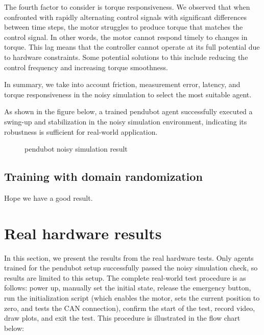 The fourth factor to consider is torque responsiveness. We observed that when confronted with rapidly alternating control signals with significant differences between time steps, the motor struggles to produce torque that matches the control signal. In other words, the motor cannot respond timely to changes in torque. This lag means that the controller cannot operate at its full potential due to hardware constraints. Some potential solutions to this include reducing the control frequency and increasing torque smoothness.

In summary, we take into account friction, measurement error, latency, and torque responsiveness in the noisy simulation to select the most suitable agent.

As shown in the figure below, a trained pendubot agent successfully executed a swing-up and stabilization in the noisy simulation environment, indicating its robustness is sufficient for real-world application.

\begin{figure}[htbp]
    \centering
    \caption{pendubot noisy simulation result}
    \label{fig:image_b}
\end{figure}

\subsection{Training with domain randomization}
Hope we have a good result.


\section{Real hardware results}
In this section, we present the results from the real hardware tests. Only agents trained for the pendubot setup successfully passed the noisy simulation check, so results are limited to this setup. The complete real-world test procedure is as follows: power up, manually set the initial state, release the emergency button, run the initialization script (which enables the motor, sets the current position to zero, and tests the CAN connection), confirm the start of the test, record video, draw plots, and exit the test. This procedure is illustrated in the flow chart below:

